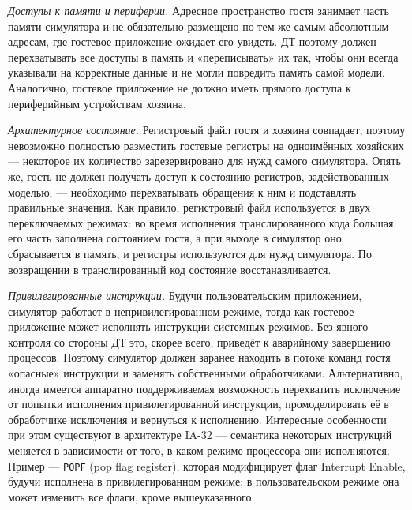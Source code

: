 \begin{itemize*}

\item \textit{Доступы к памяти и периферии.} Адресное пространство гостя занимает часть памяти симулятора и не обязательно размещено по тем же самым абсолютным адресам, где гостевое приложение ожидает его увидеть. ДТ поэтому должен перехватывать все доступы в память и «переписывать» их так, чтобы они всегда указывали на корректные данные и не могли повредить память самой модели. Аналогично, гостевое приложение не должно иметь прямого доступа к периферийным устройствам хозяина.

\item \textit{Архитектурное состояние.} Регистровый файл гостя и хозяина совпадает, поэтому невозможно полностью разместить гостевые регистры на одноимённых хозяйских — некоторое их количество зарезервировано для нужд самого симулятора. Опять же, гость не должен получать доступ к состоянию регистров, задействованных моделью, — необходимо перехватывать обращения к ним и подставлять правильные значения. Как правило, регистровый файл используется в двух переключаемых режимах: во время исполнения транслированного кода большая его часть заполнена состоянием гостя, а при выходе в симулятор оно сбрасывается в память, и регистры используются для нужд симулятора. По возвращении в транслированный код состояние восстанавливается.

\item\textit{Привилегированные инструкции.} Будучи пользовательским приложением, симулятор работает в непривилегированном режиме, тогда как гостевое приложение может исполнять инструкции системных режимов. Без явного контроля со стороны ДТ это, скорее всего, приведёт к аварийному завершению процессов. Поэтому симулятор должен заранее находить в потоке команд гостя «опасные» инструкции и заменять собственными обработчиками. Альтернативно, иногда имеется аппаратно поддерживаемая возможность перехватить исключение от попытки исполнения привилегированной инструкции, промоделировать её в обработчике исключения и вернуться к исполнению. Интересные особенности при этом существуют в архитектуре IA-32 — семантика некоторых инструкций меняется в зависимости от того, в каком режиме процессора они исполняются. Пример — \texttt{POPF} (\abbr pop flag register), которая модифицирует флаг Interrupt Enable, будучи исполнена в привилегированном режиме; в пользовательском режиме она может изменить все флаги, кроме вышеуказанного.

\end{itemize*}

